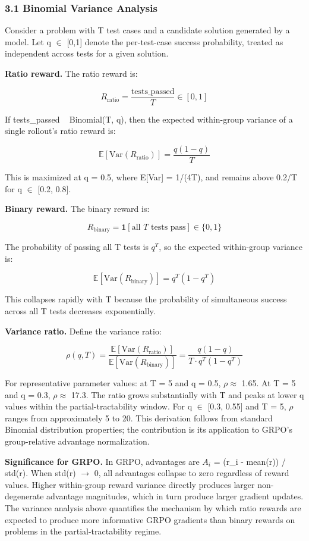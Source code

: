 
\subsubsection{3.1 Binomial Variance Analysis}

Consider a problem with T test cases and a candidate solution generated by a model. Let q $\in$ [0,1] denote the per-test-case success probability, treated as independent across tests for a given solution.

\textbf{Ratio reward.} The ratio reward is:

$$R_{\text{ratio}} = \frac{\text{tests\_passed}}{T} \in [0, 1]$$

If tests\_passed ~ Binomial(T, q), then the expected within-group variance of a single rollout's ratio reward is:

$$\mathbb{E}[\text{Var}(R_{\text{ratio}})] = \frac{q(1-q)}{T}$$

This is maximized at q = 0.5, where E[Var] = 1/(4T), and remains above 0.2/T for q $\in$ [0.2, 0.8].

\textbf{Binary reward.} The binary reward is:

$$R_{\text{binary}} = \mathbf{1}[\text{all } T \text{ tests pass}] \in \{0, 1\}$$

The probability of passing all T tests is $q^T$, so the expected within-group variance is:

$$\mathbb{E}[\text{Var}(R_{\text{binary}})] = q^T(1 - q^T)$$

This collapses rapidly with T because the probability of simultaneous success across all T tests decreases exponentially.

\textbf{Variance ratio.} Define the variance ratio:

$$\rho(q, T) = \frac{\mathbb{E}[\text{Var}(R_{\text{ratio}})]}{\mathbb{E}[\text{Var}(R_{\text{binary}})]} = \frac{q(1-q)}{T \cdot q^T(1-q^T)}$$

For representative parameter values: at T = 5 and q = 0.5, $\rho \approx$ 1.65. At T = 5 and q = 0.3, $\rho \approx$ 17.3. The ratio grows substantially with T and peaks at lower q values within the partial-tractability window. For q $\in$ [0.3, 0.55] and T = 5, $\rho$ ranges from approximately 5 to 20. This derivation follows from standard Binomial distribution properties; the contribution is its application to GRPO's group-relative advantage normalization.

\textbf{Significance for GRPO.} In GRPO, advantages are $A_i$ = (r\_i - mean(r)) / std(r). When std(r) $\rightarrow$ 0, all advantages collapse to zero regardless of reward values. Higher within-group reward variance directly produces larger non-degenerate advantage magnitudes, which in turn produce larger gradient updates. The variance analysis above quantifies the mechanism by which ratio rewards are expected to produce more informative GRPO gradients than binary rewards on problems in the partial-tractability regime.

